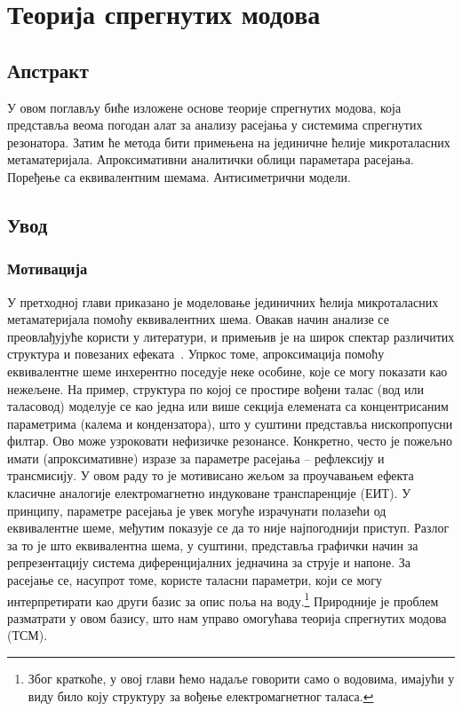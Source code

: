 \chapter{Теорија спрегнутих модова}

\section{Апстракт}
У овом поглављу биће изложене основе теорије спрегнутих модова, која представља веома погодан алат за анализу расејања у системима спрегнутих резонатора. Затим ће метода бити примењена на јединичне ћелије микроталасних метаматеријала. Апроксимативни аналитички облици параметара расејања. Поређење са еквивалентним шемама. Антисиметрични модели.

\section{Увод}
\subsection{Мотивација}%
У претходној глави приказано је моделовање јединичних ћелија микроталасних метаматеријала помоћу еквивалентних шема. Овакав начин анализе се преовлађујуће користи у литератури, и примењив је на широк спектар различитих структура и повезаних ефеката~\cite{baena,aznar_improved,naqui:13,radoman}.
Упркос томе, апроксимација помоћу еквивалентне шеме инхерентно поседује неке особине, које се могу показати као нежељене.
На пример, структура по којој се простире вођени талас (вод или таласовод) моделује се као једна или више секција елемената са концентрисаним параметрима (калема и кондензатора), што у суштини представља нископропусни филтар. Ово може узроковати нефизичке резонансе.
Конкретно, често је пожељно имати (апроксимативне) изразе за параметре расејања -- рефлексију и трансмисију. У овом раду то је мотивисано жељом за проучавањем ефекта класичне аналогије електромагнетно индуковане транспаренције (ЕИТ). У принципу, параметре расејања је увек могуће израчунати полазећи од еквивалентне шеме, међутим показује се да то није најпогоднији приступ. Разлог за то је што еквивалентна шема, у суштини, представља графички начин за репрезентацију система диференцијалних једначина за струје и напоне. За расејање се, насупрот томе, користе таласни параметри, који се могу интерпретирати као други базис за опис поља на воду.\footnote{Због краткоће, у овој глави ћемо надаље говорити само о водовима, имајући у виду било коју структуру за вођење електромагнетног таласа.} Природније је проблем разматрати у овом базису, што нам управо омогућава теорија спрегнутих модова (ТСМ).
